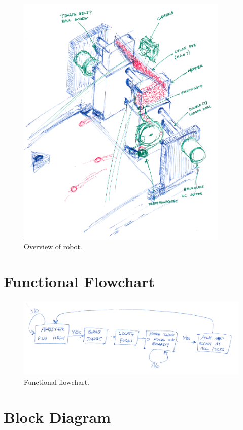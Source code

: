 \documentclass[10pt,letterpaper]{article}
\begin{document}
\begin{figure}[!h]
	\centering
	\includegraphics[width=0.9\textwidth]{robot_overview.png}
	\caption{Overview of robot.}
	\label{fig:robot}
\end{figure}


\newpage
\section*{Functional Flowchart}

\begin{figure}[!h]
	\centering
	\includegraphics[width=1.0\textwidth]{flowchart.png}
	\caption{Functional flowchart.}
	\label{fig:flowchart}
\end{figure}


\section*{Block Diagram}
\end{document}

